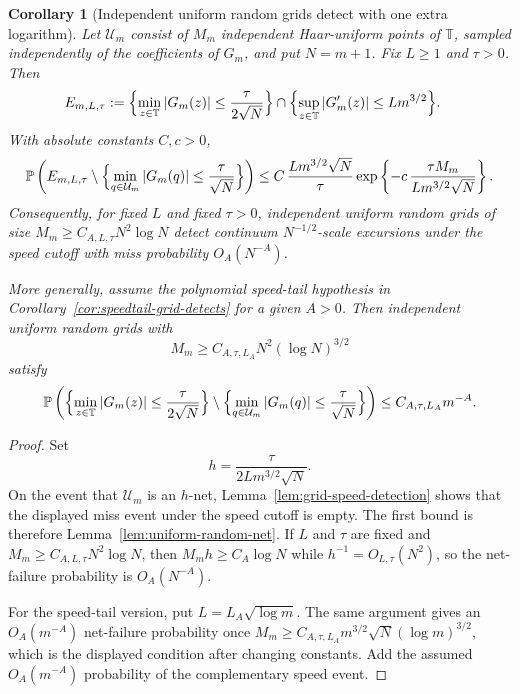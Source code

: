 \documentclass[11pt]{amsart}
\numberwithin{equation}{section}
\newtheorem{corollary}[theorem]{Corollary}
\theoremstyle{definition}
\theoremstyle{remark}
\newcommand{\T}{\mathbb T}
\newcommand{\Prob}{\mathbb P}
\newcommand{\abs}[1]{\left\lvert #1\right\rvert}
\begin{document}
\begin{corollary}[Independent uniform random grids detect with one extra logarithm]
\label{cor:uniform-random-grid-detects}
Let \(\mathcal U_m\) consist of \(M_m\) independent Haar-uniform points of
\(\T\), sampled independently of the coefficients of \(G_m\), and put
\(N=m+1\).  Fix \(L\ge1\) and \(\tau>0\).  Then
\[
\begin{aligned}
  E_{m,L,\tau}:={}&
  \Bigl\{\min_{z\in\T}\abs{G_m(z)}\le \frac{\tau}{2\sqrt N}\Bigr\}
  \cap
  \Bigl\{\sup_{z\in\T}\abs{G_m'(z)}\le Lm^{3/2}\Bigr\}.
\end{aligned}
\]
With absolute constants \(C,c>0\),
\[
  \Prob\left(
    E_{m,L,\tau}\setminus
    \Bigl\{\min_{q\in \mathcal U_m}\abs{G_m(q)}
        \le \frac{\tau}{\sqrt N}\Bigr\}
  \right)
  \le
  C\,\frac{Lm^{3/2}\sqrt N}{\tau}
  \exp\left\{-c\,\frac{\tau M_m}{Lm^{3/2}\sqrt N}\right\}.
\]
Consequently, for fixed \(L\) and fixed \(\tau>0\), independent uniform random
grids of size \(M_m\ge C_{A,L,\tau}N^2\log N\) detect continuum
\(N^{-1/2}\)-scale excursions under the speed cutoff with miss probability
\(O_A(N^{-A})\).

More generally, assume the polynomial speed-tail hypothesis in
Corollary~\ref{cor:speedtail-grid-detects} for a given \(A>0\).  Then
independent uniform random grids with
\[
  M_m\ge C_{A,\tau,L_A}N^2(\log N)^{3/2}
\]
satisfy
\[
  \Prob\left(
    \Bigl\{\min_{z\in\T}\abs{G_m(z)}\le \frac{\tau}{2\sqrt N}\Bigr\}
    \setminus
    \Bigl\{\min_{q\in \mathcal U_m}\abs{G_m(q)}
        \le \frac{\tau}{\sqrt N}\Bigr\}
  \right)
  \le C_{A,\tau,L_A}m^{-A}.
\]
\end{corollary}

\begin{proof}
Set
\[
  h=\frac{\tau}{2Lm^{3/2}\sqrt N}.
\]
On the event that \(\mathcal U_m\) is an \(h\)-net,
Lemma~\ref{lem:grid-speed-detection} shows that the displayed miss event under
the speed cutoff is empty.  The first bound is therefore
Lemma~\ref{lem:uniform-random-net}.  If \(L\) and \(\tau\) are fixed and
\(M_m\ge C_{A,L,\tau}N^2\log N\), then \(M_mh\ge C_A\log N\) while
\(h^{-1}=O_{L,\tau}(N^2)\), so the net-failure probability is \(O_A(N^{-A})\).

For the speed-tail version, put \(L=L_A\sqrt{\log m}\).  The same argument
gives an \(O_A(m^{-A})\) net-failure probability once
\(M_m\ge C_{A,\tau,L_A}m^{3/2}\sqrt N(\log m)^{3/2}\), which is the displayed
condition after changing constants.  Add the assumed \(O_A(m^{-A})\)
probability of the complementary speed event.
\end{proof}
\end{document}
